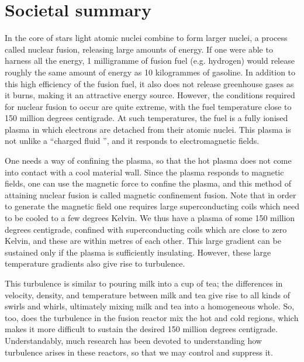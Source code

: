 \chapter*{Societal summary}

In the core of stars light atomic nuclei combine to form larger nuclei, a process called nuclear fusion, releasing large amounts of energy. If one were able to harness all the energy, 1 milligramme of fusion fuel (e.g. hydrogen) would release roughly the same amount of energy as 10 kilogrammes of gasoline. In addition to this high efficiency of the fusion fuel, it also does not release greenhouse gases as it burns, making it an attractive energy source. However, the conditions required for nuclear fusion to occur are quite extreme, with the fuel temperature close to 150 million degrees centigrade. At such temperatures, the fuel is a fully ionised plasma in which electrons are detached from their atomic nuclei. This plasma is not unlike a ``charged fluid '', and it responds to electromagnetic fields. \par  
One needs a way of confining the plasma, so that the hot plasma does not come into contact with a cool material wall. Since the plasma responds to magnetic fields, one can use the magnetic force to confine the plasma, and this method of attaining nuclear fusion is called magnetic confinement fusion. Note that in order to generate the magnetic field one requires large superconducting coils which need to be cooled to a few degrees Kelvin. We thus have a plasma of some 150 million degrees centigrade, confined with superconducting coils which are close to zero Kelvin, and these are within metres of each other. This large gradient can be sustained only if the plasma is sufficiently insulating. However, these large temperature gradients also give rise to turbulence. \par
This turbulence is similar to pouring milk into a cup of tea; the differences in velocity, density, and temperature between milk and tea give rise to all kinds of swirls and whirls, ultimately mixing milk and tea into a homogeneous whole. So, too, does the turbulence in the fusion reactor mix the hot and cold regions, which makes it more difficult to sustain the desired 150 million degrees centigrade. Understandably, much research has been devoted to understanding how turbulence arises in these reactors, so that we may control and suppress it. \par 
